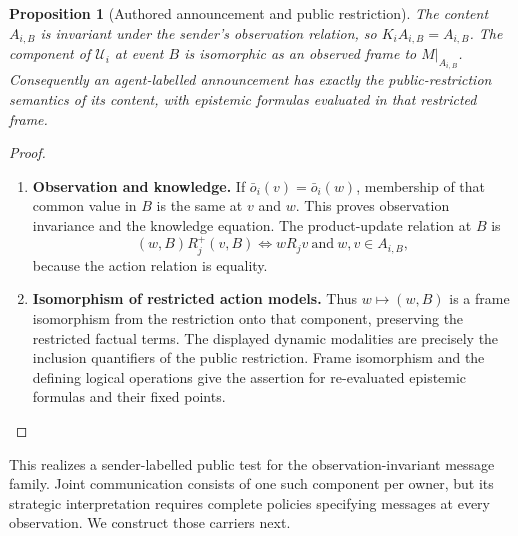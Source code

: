 \documentclass[11pt,a4paper]{article}
\numberwithin{equation}{section}
\newtheorem{proposition}[theorem]{Proposition}
\theoremstyle{definition}
\theoremstyle{remark}
\theoremstyle{plain}
\begin{document}
\begin{proposition}[Authored announcement and public restriction]
\label{prop:egt-agent-announcement-restriction}
The content $A_{i,B}$ is invariant under the sender's observation relation,
so $K_iA_{i,B}=A_{i,B}$. The component of $\mathcal U_i$ at event $B$ is
isomorphic as an observed frame to $M|_{A_{i,B}}$. Consequently an
agent-labelled announcement has exactly the public-restriction semantics of
its content, with epistemic formulas evaluated in that restricted frame.
\end{proposition}
\begin{proof}
\leavevmode
\begin{enumerate}[label=\textup{(\arabic*)},leftmargin=*,itemsep=4pt,topsep=3pt]
  \item \textbf{Observation and knowledge.} If $\bar o_i(v)=\bar o_i(w)$, membership of that common value in $B$ is the
same at $v$ and $w$. This proves observation invariance and the knowledge
equation. The product-update relation at $B$ is
\[
 (w,B)R_j^+(v,B)
 \iff wR_jv\ \text{and}\ w,v\in A_{i,B},
\]
because the action relation is equality.
  \item \textbf{Isomorphism of restricted action models.} Thus $w\mapsto(w,B)$ is a frame
isomorphism from the restriction onto that component, preserving the
restricted factual terms. The displayed dynamic modalities are precisely
the inclusion quantifiers of the public restriction. Frame isomorphism and
the defining logical operations give the assertion for re-evaluated
epistemic formulas and their fixed points.
\end{enumerate}
\end{proof}

This realizes a sender-labelled public test for the
observation-invariant message family. Joint communication consists of
one such component per owner, but its strategic interpretation requires
complete policies specifying messages at every observation. We
construct those carriers next.
\end{document}

